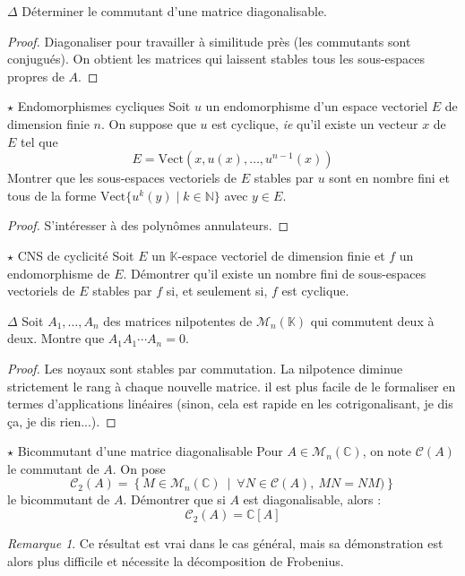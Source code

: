 \documentclass[french,a4paper]{article}
\newcommand{\N}{\mathbb{N}}
\newcommand{\C}{\mathbb{C}}
\newcommand{\K}{\mathbb{K}}
\theoremstyle{plain}
\theoremstyle{definition}
\theoremstyle{remark}
\newtheorem*{rmq}{Remarque}
\begin{document}
\begin{ex}{$\Delta$}
	Déterminer le commutant d'une matrice diagonalisable.
\end{ex}
\begin{proof}
	Diagonaliser pour travailler à similitude près (les commutants sont conjugués). On obtient les matrices qui laissent stables tous les sous-espaces propres de $A$.
\end{proof}

\begin{ex}{$\star$ Endomorphismes cycliques}
	Soit $u$ un endomorphisme d'un espace vectoriel $E$ de dimension finie $n$. On suppose que $u$ est cyclique, \textit{ie} qu'il existe un vecteur $x$ de $E$ tel que $$E=\text{Vect}(x,u(x),\ldots,u^{n-1}(x))$$ Montrer que les sous-espaces vectoriels de $E$ stables par $u$ sont en nombre fini et tous de la forme $\text{Vect}\{u^k(y)\mid k\in\N\}$ avec $y\in E$.
\end{ex}
\begin{proof}
	S'intéresser à des polynômes annulateurs.
\end{proof}

\begin{ex}[Châteaux]{$\star$ CNS de cyclicité}
	Soit $E$ un $\K$-espace vectoriel de dimension finie et $f$ un endomorphisme de $E$. Démontrer qu'il existe un nombre fini de sous-espaces vectoriels de $E$ stables par $f$ si, et seulement si, $f$ est cyclique.
\end{ex}

\begin{ex}{$\Delta$}
	Soit $A_1,\ldots,A_n$ des matrices nilpotentes de $\mathcal{M}_n(\K)$ qui commutent deux à deux. Montre que $A_1A_1\cdots A_n=0$.
\end{ex}
\begin{proof}
	Les noyaux sont stables par commutation. La nilpotence diminue strictement le rang à chaque nouvelle matrice. il est plus facile de le formaliser en termes d'applications linéaires (sinon, cela est rapide en les cotrigonalisant, je dis ça, je dis rien...).
\end{proof}

\begin{ex}[Châteaux]{$\star$ Bicommutant d'une matrice diagonalisable}
	Pour $A\in\mathcal{M}_n(\C)$, on note $\mathcal{C}(A)$ le commutant de $A$. On pose $$\mathcal{C}_2(A)=\left\{M\in\mathcal{M}_n(\C)\ \mid\ \forall N\in\mathcal{C}(A),\ MN=NM)\right\}$$ le bicommutant de $A$. Démontrer que si $A$ est diagonalisable, alors : $$\mathcal{C}_2(A)=\C[A]$$
\end{ex}
\begin{rmq}
	Ce résultat est vrai dans le cas général, mais sa démonstration est alors plus difficile et nécessite la décomposition de Frobenius.
\end{rmq}
\end{document}
